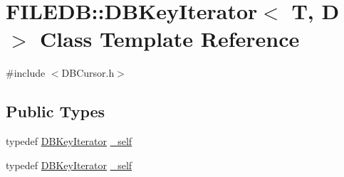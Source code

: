 \hypertarget{classFILEDB_1_1DBKeyIterator}{}\section{F\+I\+L\+E\+DB\+:\+:D\+B\+Key\+Iterator$<$ T, D $>$ Class Template Reference}
\label{classFILEDB_1_1DBKeyIterator}


{\ttfamily \#include $<$D\+B\+Cursor.\+h$>$}

\subsection*{Public Types}
\begin{DoxyCompactItemize}
\item 
typedef \mbox{\hyperlink{classFILEDB_1_1DBKeyIterator}{D\+B\+Key\+Iterator}} \mbox{\hyperlink{classFILEDB_1_1DBKeyIterator_aaf7773c7a848ec6e04bc738dd794ace1}{\+\_\+self}}
\item 
typedef \mbox{\hyperlink{classFILEDB_1_1DBKeyIterator}{D\+B\+Key\+Iterator}} \mbox{\hyperlink{classFILEDB_1_1DBKeyIterator_aaf7773c7a848ec6e04bc738dd794ace1}{\+\_\+self}}
\end{DoxyCompactItemize}
